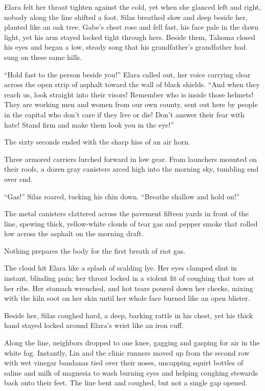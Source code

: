 Elara felt her throat tighten against the cold, yet when she glanced left and right, nobody along the line shifted a foot. Silas breathed slow and deep beside her, planted like an oak tree. Gabe's chest rose and fell fast, his face pale in the dawn light, yet his arm stayed locked tight through hers. Beside them, Tahoma closed his eyes and began a low, steady song that his grandfather's grandfather had sung on these same hills.

``Hold fast to the person beside you!'' Elara called out, her voice carrying clear across the open strip of asphalt toward the wall of black shields. ``And when they reach us, look straight into their visors! Remember who is inside those helmets! They are working men and women from our own county, sent out here by people in the capital who don't care if they live or die! Don't answer their fear with hate! Stand firm and make them look you in the eye!''

The sixty seconds ended with the sharp hiss of an air horn.

Three armored carriers lurched forward in low gear. From launchers mounted on their roofs, a dozen gray canisters arced high into the morning sky, tumbling end over end.

``Gas!'' Silas roared, tucking his chin down. ``Breathe shallow and hold on!''

The metal canisters clattered across the pavement fifteen yards in front of the line, spewing thick, yellow-white clouds of tear gas and pepper smoke that rolled low across the asphalt on the morning draft.

Nothing prepares the body for the first breath of riot gas. 

The cloud hit Elara like a splash of scalding lye. Her eyes clamped shut in instant, blinding pain; her throat locked in a violent fit of coughing that tore at her ribs. Her stomach wrenched, and hot tears poured down her cheeks, mixing with the kiln soot on her skin until her whole face burned like an open blister. 

Beside her, Silas coughed hard, a deep, barking rattle in his chest, yet his thick hand stayed locked around Elara’s wrist like an iron cuff. 

Along the line, neighbors dropped to one knee, gagging and gasping for air in the white fog. Instantly, Lin and the clinic runners moved up from the second row with wet vinegar bandanas tied over their noses, uncapping squirt bottles of saline and milk of magnesia to wash burning eyes and helping coughing stewards back onto their feet. The line bent and coughed, but not a single gap opened.

